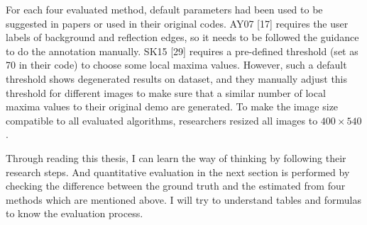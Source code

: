 \documentclass{article}
\begin{document}
  For each four evaluated method, default parameters had been used to be suggested in papers or used in their original codes. AY07 [17] requires the user labels of background and reflection edges, so it needs to be followed the guidance to do the annotation manually. SK15 [29] requires a pre-defined threshold (set as 70 in their code) to choose some local maxima values. However, such a default threshold shows degenerated results on dataset, and they manually adjust this threshold for different images to make sure that a similar number of local maxima values to their original demo are generated. To make the image size compatible to all evaluated algorithms, researchers resized all images to $400\times540$.
  
  Through reading this thesis, I can learn the way of thinking by following their research steps. And quantitative evaluation in the next section is performed by checking the difference between the ground truth and the estimated from four methods which are mentioned above. I will try to understand tables and formulas to know the evaluation process.
\end{document}

